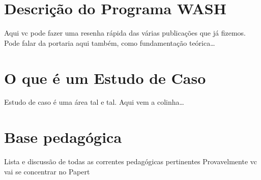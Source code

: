 \documentclass[
12pt,		%
openright,	%
twoside,  %
a4paper,			%
chapter=TITLE,		%
english,			%
french,				%
spanish,			%
brazil				%
]{USPSC-classe/USPSC}
\begin{document}
\section[Descri\c{c}\~ao do Programa WASH]{Descri\c{c}\~ao do Programa WASH}\label{Descri\c{c}\~ao do Programa WASH}
Aqui vc pode fazer uma resenha r\'apida das v\'arias publica\c{c}\~oes que j\'a fizemos. Pode falar da portaria aqui tamb\'em, como fundamenta\c{c}\~ao te\'orica… 
\section[O que \'e um Estudo de Caso]{O que \'e um Estudo de Caso}\label{O que \'e um Estudo de Caso}
Estudo de caso \'e uma \'area tal e tal. Aqui vem a colinha… 
\section[Base pedag\'ogica]{Base pedag\'ogica}\label{Base pedag\'ogica}
Lista e discuss\~ao de todas as correntes pedag\'ogicas pertinentes
Provavelmente vc vai se concentrar no Papert
\end{document}
